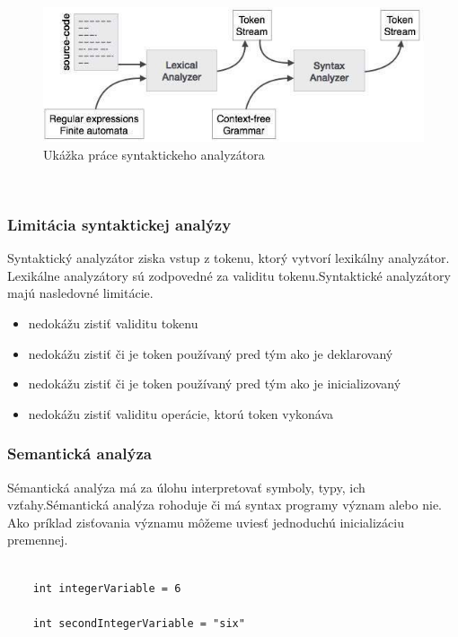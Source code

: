  \newline
  \newline
\begin{figure}[!htbp]
	\centering
	\includegraphics[width=15cm]{img/syntax_analyzer.jpg}
	\caption{Ukážka práce syntaktickeho  analyzátora}
	\label{fig:test}
\end{figure}
 \newline
 \newpage
\subsubsection{Limitácia syntaktickej analýzy}
\indent Syntaktický analyzátor ziska vstup z tokenu, ktorý vytvorí lexikálny analyzátor. Lexikálne analyzátory sú zodpovedné za validitu tokenu.Syntaktické analyzátory majú nasledovné limitácie.

\begin{itemize}
	\item nedokážu zistiť validitu tokenu
	\item nedokážu zistiť či je token používaný pred tým ako je deklarovaný
	\item nedokážu zistiť či je token používaný pred tým ako je inicializovaný
	\item nedokážu zistiť validitu operácie, ktorú token vykonáva
\end{itemize}



\subsubsection{Semantická  analýza}
\indent Sémantická analýza má za úlohu interpretovať symboly, typy, ich vzťahy.Sémantická analýza rohoduje či má syntax programy význam alebo nie.
Ako príklad zisťovania významu môžeme uviesť jednoduchú inicializáciu premennej.

\begin{lstlisting}

	int integerVariable = 6

	int secondIntegerVariable = "six"
\end{lstlisting}

